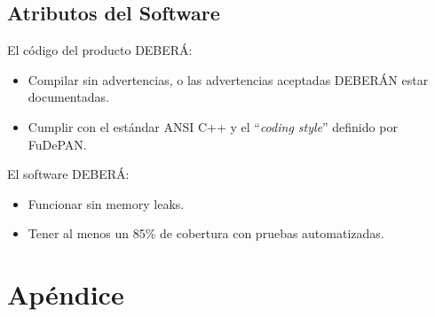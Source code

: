 \documentclass[12pt,a4paper,english,spanish]{article}
\begin{document}
\subsection{Atributos del Software}
\par El código del producto DEBERÁ:
\begin{itemize}
 \item Compilar sin advertencias, o las advertencias aceptadas DEBERÁN estar documentadas.
 \item Cumplir con el estándar ANSI C++ y el ``\textit{coding style}'' definido por FuDePAN.
\end{itemize}
\par El software DEBERÁ:
\begin{itemize}
	\item Funcionar sin memory leaks.
	\item Tener al menos un 85\% de cobertura con pruebas automatizadas.
\end{itemize}

\section{Apéndice}
\end{document}
